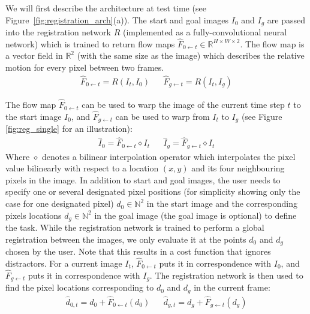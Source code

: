 We will first describe the architecture at test time (see Figure~\ref{fig:registration_arch}(a)). The start and goal images $I_0$ and $I_g$ are passed into the registration network $R$ (implemented as a fully-convolutional neural network) which is trained to return flow maps $\hat{F}_{0 \leftarrow t} \in \mathbb{R}^{H \times W \times 2}$. The flow map is a vector field in $\mathbb{R}^2$ (with the same size as the image) which describes the relative motion for every pixel between two frames.
\begin{align}
    \hat{F}_{0 \leftarrow t} = R(I_t, I_0) &&
    \hat{F}_{g \leftarrow t} = R(I_t, I_g)
\end{align}

The flow map $\hat{F}_{0 \leftarrow t}$ can be used to warp the image of the current time step $t$ to the start image $I_0$, and $\hat{F}_{g \leftarrow t}$ can be used to warp from $I_t$ to $I_g$ (see Figure \ref{fig:reg_single} for an illustration):
\begin{align}
    \hat{I}_0 = \hat{F}_{0 \leftarrow t} \diamond  I_t &&
    \hat{I}_g = \hat{F}_{g \leftarrow t} \diamond  I_t 
\end{align}
Where $\diamond$ denotes a bilinear interpolation operator which interpolates the pixel value bilinearly with respect to a location $(x,y)$ and its four neighbouring pixels in the image.
In addition to start and goal images, the user needs to specify one or several designated pixel positions (for simplicity showing only the case for one designated pixel) $d_0 \in \mathbb{N}^2$ in the start image and the corresponding pixels locations $d_g \in \mathbb{N}^2$ in the goal image (the goal image is optional) to define the task. While the registration network is trained to perform a global registration between the images, we only evaluate it at the points $d_0$ and $d_g$ chosen by the user. Note that this results in a cost function that ignores distractors. For a current image $I_t$, $\hat{F}_{0 \leftarrow t}$ puts it in correspondence with $I_0$, and $\hat{F}_{g \leftarrow t}$ puts it in correspondence with $I_g$. The registration network is then used to find the pixel locations corresponding to $d_0$ and $d_g$ in the current frame: 
\begin{align}
    \hat{d}_{0,t} = d_0 + \hat{F}_{0 \leftarrow t}(d_0) &&
    \hat{d}_{g,t} = d_g + \hat{F}_{g \leftarrow t}(d_g)
    \label{eqn:warped_pos}
\end{align}

